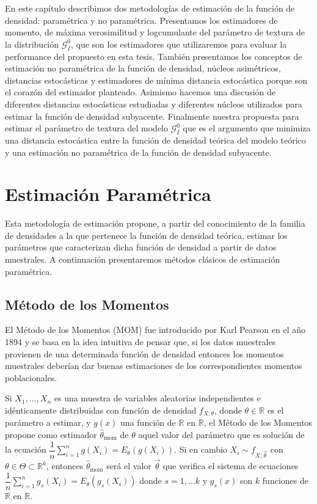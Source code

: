 En este capítulo describimos dos metodologías de estimación de la función de densidad: paramétrica y no paramétrica. Presentamos los estimadores de momento, de máxima verosimilitud y logcumulante del parámetro de textura de la distribución $\mathcal{G}_I^0$, que son los estimadores que utilizaremos para evaluar la performance del propuesto en esta tesis. También presentamos los conceptos de estimación no paramétrica de la función de densidad, núcleos asimétricos, distancias estocásticas y estimadores de mínima distancia estocástica porque son el corazón del estimador planteado.  Asimismo hacemos una discusión de diferentes distancias estocásticas estudiadas y diferentes núcleos utilizados para estimar la función de densidad subyacente. Finalmente nuestra propuesta para estimar el parámetro de textura del modelo $\mathcal{G}_I^0$ que es el argumento que minimiza una distancia estocástica entre la función de densidad teórica del modelo teórico y una estimación no paramétrica de la función de densidad subyacente. 


\section{Estimación Paramétrica}
\label{EstimacionParamétrica}

Esta metodología de estimación propone, a partir del conocimiento de la familia de densidades a la que pertenece la función de densidad teórica, estimar los parámetros que caracterizan dicha función de densidad a partir de datos muestrales. A continuación presentaremos métodos clásicos de estimación paramétrica.

\subsection{Método de los Momentos}
El Método de los Momentos (MOM) fue introducido por Karl Pearson en el año 1894 y se basa en la idea intuitiva de pensar que, si los datos muestrales provienen de una determinada función de densidad entonces los momentos muestrales deberían dar buenas estimaciones de los correspondientes momentos poblacionales. 

\begin{definition}
Si $X_1, \ldots, X_n$ es una muestra de variables aleatorias independientes e idénticamente distribuidas con función de densidad $f_{X;\theta}$, donde $\theta \in \mathbb{R}$ es el parámetro a estimar, y $g(x)$ una función de $\mathbb{R}$ en $\mathbb{R}$, el Método de los Momentos propone como estimador $\hat{\theta}_{\text{mom}}$ de $\theta$ aquel valor del parámetro que es solución de la ecuación  $\dfrac{1}{n} \sum_{i=1}^n g(X_i)=E_{\theta}(g(X_i)).$  
Si en cambio $X_i \sim f_{X;\vec{\theta}}$ con $\theta \in \Theta \subset \mathbb{R}^k$, entonces $\hat{\theta}_{\text{mom}}$ será el valor $\vec{\theta}$ que verifica el sistema de ecuaciones $\dfrac{1}{n} \sum_{i=1}^n g_s(X_i)=E_{\theta}(g_s(X_i))$ donde $s=1, \ldots k$ y $g_s(x)$ son $k$ funciones de $\mathbb{R}$ en $\mathbb{R}$.
\end{definition}


